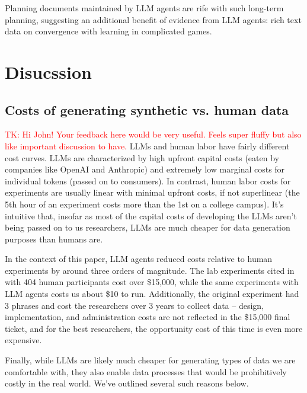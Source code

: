 \documentclass{article} %
\newcommand{\TK}[1]{\textcolor{red}{TK: #1}}
\begin{document}
Planning documents maintained by LLM agents are rife with such long-term planning, suggesting an additional benefit of evidence from LLM agents: rich text data on convergence with learning in complicated games.


\section{Disucssion}
\subsection{Costs of generating synthetic vs. human data}
\TK{Hi John! Your feedback here would be very useful. 
Feels super fluffy but also like important discussion to have.}
LLMs and human labor have fairly different cost curves. 
LLMs are characterized by high upfront capital costs (eaten by companies like OpenAI and Anthropic) and extremely low marginal costs for individual tokens (passed on to consumers). 
In contrast, human labor costs for experiments are usually linear with minimal upfront costs, if not superlinear (the 5th hour of an experiment costs more than the 1st on a college campus). 
It's intuitive that, insofar as most of the capital costs of developing the LLMs aren't being passed on to us researchers, LLMs are much cheaper for data generation purposes than humans are.

In the context of this paper, LLM agents reduced costs relative to human experiments by around three orders of magnitude. 
The lab experiments cited in \cite{li2017obviously} with 404 human participants cost over \$15,000, while the same experiments with LLM agents costs us about \$10 to run. 
Additionally, the original experiment had 3 phrases and cost the researchers over 3 years to collect data -- design, implementation, and administration costs are not reflected in the \$15,000 final ticket, and for the best researchers, the opportunity cost of this time is even more expensive.

Finally, while LLMs are likely much cheaper for generating types of data we are comfortable with, they also enable data processes that would be prohibitively costly in the real world. 
We've outlined several such reasons below.
\end{document}
